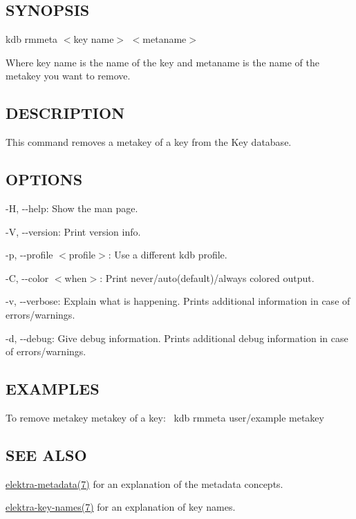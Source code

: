 \subsection*{S\+Y\+N\+O\+P\+S\+IS}

{\ttfamily kdb rmmeta $<$key name$>$ $<$metaname$>$}

Where {\ttfamily key name} is the name of the key and {\ttfamily metaname} is the name of the metakey you want to remove.

\subsection*{D\+E\+S\+C\+R\+I\+P\+T\+I\+ON}

This command removes a metakey of a key from the Key database.

\subsection*{O\+P\+T\+I\+O\+NS}


\begin{DoxyItemize}
\item {\ttfamily -\/H}, {\ttfamily -\/-\/help}\+: Show the man page.
\item {\ttfamily -\/V}, {\ttfamily -\/-\/version}\+: Print version info.
\item {\ttfamily -\/p}, {\ttfamily -\/-\/profile $<$profile$>$}\+: Use a different kdb profile.
\item {\ttfamily -\/C}, {\ttfamily -\/-\/color $<$when$>$}\+: Print never/auto(default)/always colored output.
\item {\ttfamily -\/v}, {\ttfamily -\/-\/verbose}\+: Explain what is happening. Prints additional information in case of errors/warnings.
\item {\ttfamily -\/d}, {\ttfamily -\/-\/debug}\+: Give debug information. Prints additional debug information in case of errors/warnings.
\end{DoxyItemize}

\subsection*{E\+X\+A\+M\+P\+L\+ES}

To remove metakey {\ttfamily metakey} of a key\+:~\newline
 {\ttfamily kdb rmmeta user/example metakey}

\subsection*{S\+EE A\+L\+SO}


\begin{DoxyItemize}
\item \hyperlink{doc_help_elektra-metadata_md}{elektra-\/metadata(7)} for an explanation of the metadata concepts.
\item \hyperlink{doc_help_elektra-key-names_md}{elektra-\/key-\/names(7)} for an explanation of key names. 
\end{DoxyItemize}